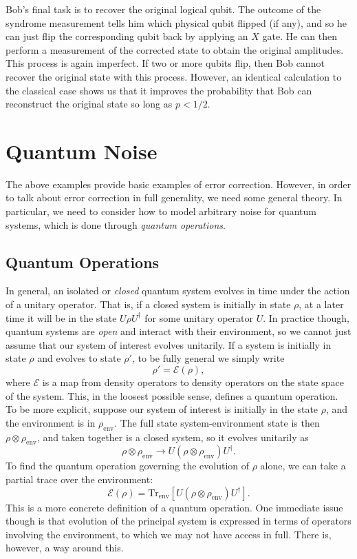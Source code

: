 \documentclass[12pt,a4paper]{report}
\numberwithin{equation}{section}
\theoremstyle{definition}
\theoremstyle{theorem}
\theoremstyle{theorem}
\theoremstyle{example}
\theoremstyle{definition}
\begin{document}
Bob's final task is to recover the original logical qubit. The outcome of the syndrome measurement tells him which physical qubit flipped (if any), and so he can just flip the corresponding qubit back by applying an $X$ gate. He can then perform a measurement of the corrected state to obtain the original amplitudes.\\
This process is again imperfect. If two or more qubits flip, then Bob cannot recover the original state with this process. However, an identical calculation to the classical case shows us that it improves the probability that Bob can reconstruct the original state so long as $p<1/2$.
\section{Quantum Noise}
The above examples provide basic examples of error correction. However, in order to talk about error correction in full generality, we need some general theory. In particular, we need to consider how to model arbitrary noise for quantum systems, which is done through \textit{quantum operations}.
\subsection{Quantum Operations}
In general, an isolated or \textit{closed} quantum system evolves in time under the action of a unitary operator. That is, if a closed system is initially in state $\rho$, at a later time it will be in the state $U\rho U^{\dagger}$ for some unitary operator $U$. In practice though, quantum systems are \textit{open} and interact with their environment, so we cannot just assume that our system of interest evolves unitarily. If a system is initially in state $\rho$ and evolves to state $\rho'$, to be fully general we simply write
\begin{equation}
	\rho'=\mathcal{E}(\rho),
\end{equation}
where $\mathcal{E}$ is a map from density operators to density operators on the state space of the system. This, in the loosest possible sense, defines a quantum operation.\\
To be more explicit, suppose our system of interest is initially in the state $\rho$, and the environment is in $\rho_{\text{env}}$. The full state system-environment state is then $\rho\otimes\rho_{\text{env}}$, and taken together is a closed system, so it evolves unitarily as 
\begin{equation}
	\rho\otimes\rho_{\text{env}}\to U\left(\rho\otimes\rho_{\text{env}}\right)U^{\dagger}.
\end{equation}
To find the quantum operation governing the evolution of $\rho$ alone, we can take a partial trace over the environment:
\begin{equation}\label{qop}
	\mathcal{E}(\rho)=\text{Tr}_{\text{env}}\left[U(\rho\otimes\rho_{\text{env}})U^{\dagger}\right].
\end{equation}
This is a more concrete definition of a quantum operation. One immediate issue though is that evolution of the principal system is expressed in terms of operators involving the environment, to which we may not have access in full. There is, however, a way around this.
\end{document}
